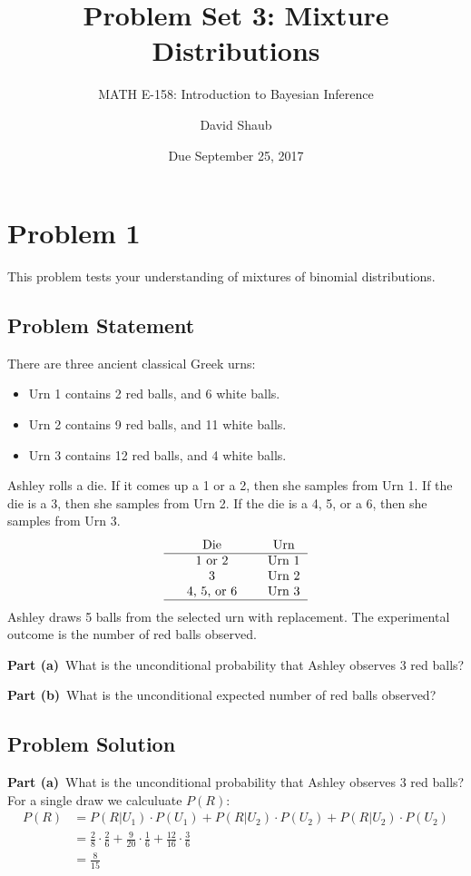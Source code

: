 \documentclass[12pt]{article}
\title{Problem Set 3: Mixture Distributions}
\author{MATH E-158: Introduction to Bayesian Inference}
\author{David Shaub}
\date{Due September 25, 2017}
\theoremstyle{definition}
\begin{document}
\maketitle





\section*{Problem 1}

This problem tests your understanding of mixtures of binomial distributions.

\subsection*{Problem Statement}

There are three ancient classical Greek urns:
\begin{itemize}
	\item Urn 1 contains 2 red balls, and 6 white balls.
	\item Urn 2 contains 9 red balls, and 11 white balls.
	\item Urn 3 contains 12 red balls, and 4 white balls.
\end{itemize}
Ashley rolls a die. If it comes up a 1 or a 2, then she samples from Urn 1. If the die is a 3, then she samples from Urn 2. If the die is a 4, 5, or a 6, then she samples from Urn 3.
$$
\begin{tabular}{ccccc}
& Die & & Urn \\
\hline
& 1 or 2 & & Urn 1\\
& 3 & & Urn 2\\
& 4, 5, or 6 & & Urn 3\\
\hline
\end{tabular}
$$
Ashley draws 5 balls from the selected urn with replacement. The experimental outcome is the number of red balls observed.

\bigskip
\noindent
{\bf Part (a)}\ What is the unconditional probability that Ashley observes 3 red balls?

\bigskip
\noindent
{\bf Part (b)}\ What is the unconditional expected number of red balls observed?

\subsection*{Problem Solution}
\noindent
{\bf Part (a)}\ What is the unconditional probability that Ashley observes 3 red balls?\\
For a single draw we calculuate $P(R)$:
\begin{align*}
P(R) &= P(R|U_1)\cdot P(U_1) + P(R|U_2)\cdot P(U_2) + P(R|U_2)\cdot P(U_2)\\
&= \frac{2}{8}\cdot\frac{2}{6} + \frac{9}{20}\cdot\frac{1}{6} + \frac{12}{16}\cdot\frac{3}{6}\\
&= \frac{8}{15}\\
\end{align*}
\end{document}
